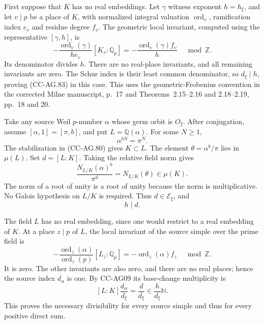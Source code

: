 First suppose that \(K\) has no real embeddings.
Let \(\gamma\) witness exponent \(h=h_\xi\), and let
\(v\mid p\) be a place of \(K\), with normalized integral
valuation \(\operatorname{ord}_v\), ramification index \(e_v\)
and residue degree \(f_v\).  The geometric local invariant,
computed using the representative \([\gamma,h]\), is
\[
 -\frac{\operatorname{ord}_v(\gamma)}
              {h e_v}[K_v:\mathbb Q_p]
       =-\frac{\operatorname{ord}_v(\gamma)f_v}{h}
                                             \quad\bmod\mathbb Z.
                                                        \tag{CC-AG.88}
\]
Its denominator divides \(h\).  There are no real-place
invariants, and all remaining invariants are zero.
The Schur index is their least common denominator, so
\(d_\xi\mid h\), proving (CC-AG.83) in this case.
This uses the geometric-Frobenius convention in the
corrected Milne manuscript, p.~17 and Theorems~2.15--2.16
and 2.18--2.19, pp.~18 and 20.

Take any source Weil \(p\)-number \(\alpha\) whose germ
orbit is \(O_\xi\).  After conjugation, assume
\([\alpha,1]=[\pi,b]\), and put \(L=\mathbb Q(\alpha)\).
For some \(N\ge1\),
\[
                              \alpha^{bN}=\pi^N.
                                                        \tag{CC-AG.89}
\]
The stabilization in (CC-AG.80) gives \(K\subset L\).
The element \(\theta=\alpha^b/\pi\) lies in \(\mu(L)\).
Set \(d=[L:K]\).  Taking the relative field norm gives
\[
 \frac{N_{L/K}(\alpha)^b}{\pi^d}
                         =N_{L/K}(\theta)\in\mu(K).
                                                        \tag{CC-AG.90}
\]
The norm of a root of unity is a root of unity because
the norm is multiplicative.  No Galois hypothesis on
\(L/K\) is required.  Thus \(d\in\mathscr E_\xi\), and
\[
                                     h\mid d.
                                                        \tag{CC-AG.91}
\]

The field \(L\) has no real embedding, since one would
restrict to a real embedding of \(K\).  At a place
\(z\mid p\) of \(L\), the local invariant of the source
simple over the prime field is
\[
 -\frac{\operatorname{ord}_z(\alpha)}
                 {\operatorname{ord}_z(p)}[L_z:\mathbb Q_p]
               =-\operatorname{ord}_z(\alpha)f_z
                                             \quad\bmod\mathbb Z.
                                                        \tag{CC-AG.92}
\]
It is zero.  The other invariants are also zero, and
there are no real places; hence the source index
\(d_\alpha\) is one.  By CC-AG09 its base-change
multiplicity is
\[
                   [L:K]\frac{d_\alpha}{d_\xi}
                         =\frac{d}{d_\xi}
                    \in\frac{h}{d_\xi}\mathbb N.
                                                        \tag{CC-AG.93}
\]
This proves the necessary divisibility for every
source simple and thus for every positive direct sum.

